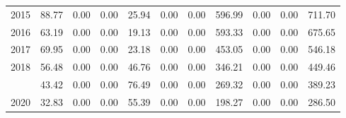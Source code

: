 \begin{longtable}[t]{rrrrrrrrrrr}
2015 & 88.77 & 0.00 & 0.00 & 25.94 & 0.00 & 0.00 & 596.99 & 0.00 & 0.00 & 711.70\\
2016 & 63.19 & 0.00 & 0.00 & 19.13 & 0.00 & 0.00 & 593.33 & 0.00 & 0.00 & 675.65\\
2017 & 69.95 & 0.00 & 0.00 & 23.18 & 0.00 & 0.00 & 453.05 & 0.00 & 0.00 & 546.18\\
2018 & 56.48 & 0.00 & 0.00 & 46.76 & 0.00 & 0.00 & 346.21 & 0.00 & 0.00 & 449.46\\
\addlinespace
2019 & 43.42 & 0.00 & 0.00 & 76.49 & 0.00 & 0.00 & 269.32 & 0.00 & 0.00 & 389.23\\
2020 & 32.83 & 0.00 & 0.00 & 55.39 & 0.00 & 0.00 & 198.27 & 0.00 & 0.00 & 286.50\\*
\end{longtable}
